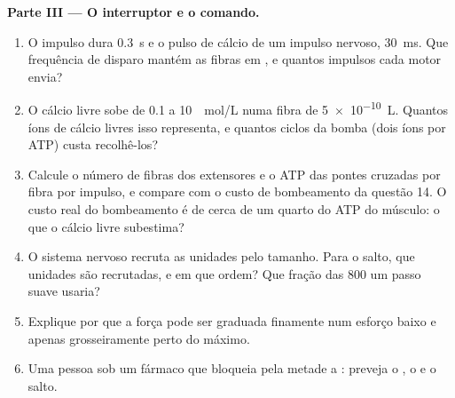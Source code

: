 \begin{problem}
\medskip
\noindent\textbf{Parte III --- O interruptor e o comando.}
\begin{enumerate}[resume]
  \item O impulso dura \qty{0.3}{s} e o pulso de cálcio de um impulso
        nervoso, \qty{30}{ms}. Que frequência de disparo mantém as
        fibras em , e quantos impulsos cada  motor envia?
  \item O cálcio livre sobe de \qty{0.1}{} a \qty{10}{\micro
        mol/L} numa fibra de \qty{5e-10}{L}. Quantos íons de cálcio
        livres isso representa, e quantos ciclos da bomba (dois íons por
        ATP) custa recolhê-los?
  \item Calcule o número de fibras dos extensores e o ATP das pontes
        cruzadas por fibra por impulso, e compare com o custo de
        bombeamento da questão 14. O custo real do bombeamento é de cerca
        de um quarto do ATP do músculo: o que o cálcio livre subestima?
  \item O sistema nervoso recruta as unidades pelo tamanho. Para o
        salto, que unidades são recrutadas, e em que ordem? Que fração
        das \num{800} um passo suave usaria?
  \item Explique por que a força pode ser graduada finamente num esforço
        baixo e apenas grosseiramente perto do máximo.
  \item Uma pessoa sob um fármaco que bloqueia pela metade a : preveja o , o  e o salto.
\end{enumerate}


\end{problem}
